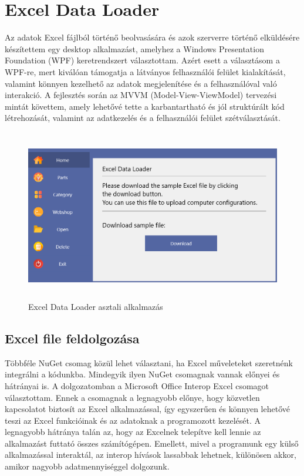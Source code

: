 \documentclass[
]{thesis-ekf}
\theoremstyle{definition}
\theoremstyle{remark}
\begin{document}
\section{Excel Data Loader}
Az adatok Excel fájlból történő beolvasására és azok szerverre történő elküldésére készítettem egy desktop alkalmazást, amelyhez a Windows Presentation Foundation (WPF) keretrendszert választottam. Azért esett a választásom a WPF-re, mert kiválóan támogatja a látványos felhasználói felület kialakítását, valamint könnyen kezelhető az adatok megjelenítése és a felhasználóval való interakció. A fejlesztés során az MVVM (Model-View-ViewModel) tervezési mintát követtem, amely lehetővé tette a karbantartható és jól struktúrált kód létrehozását, valamint az adatkezelés és a felhasználói felület szétválasztását. 
\begin{figure}[!ht]
	\centering
	\includegraphics[width=15cm, height=7.5cm]{ExcelDataLoader}
	\caption{Excel Data Loader asztali alkalmazás}
	\label{picture-ExcelDataLoader}
\end{figure}
\subsection{Excel file feldolgozása}

Többféle NuGet csomag közül lehet választani, ha Excel műveleteket szeretnénk integrálni a kódunkba. Mindegyik ilyen NuGet csomagnak vannak előnyei és hátrányai is. A dolgozatomban a Microsoft Office Interop Excel csomagot választottam. Ennek a csomagnak a legnagyobb előnye, hogy közvetlen kapcsolatot biztosít az Excel alkalmazással, így egyszerűen és könnyen lehetővé teszi az Excel funkcióinak és az adatoknak a programozott kezelését. A legnagyobb hátránya talán az, hogy az Excelnek telepítve kell lennie az alkalmazást futtató összes számítógépen. Emellett, mivel a programunk egy külső alkalmazással interaktál, az interop hívások lassabbak lehetnek, különösen akkor, amikor nagyobb adatmennyiséggel dolgozunk. 
\end{document}
